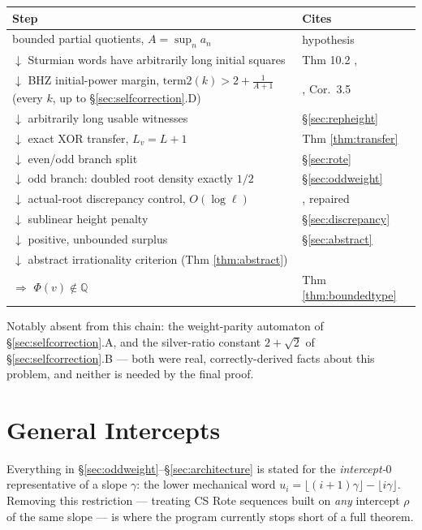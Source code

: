\documentclass[11pt]{article}
\newcommand{\Q}{\mathbb{Q}}
\begin{document}
\begin{center}
\begin{tabular}{ll}
\toprule
Step & Cites \\
\midrule
bounded partial quotients, $A=\sup_n a_n$ & hypothesis \\
$\downarrow$ Sturmian words have arbitrarily long initial squares & Thm 10.2 \cite{DeJesus2026Sturmian}, \cite{ADQZ2001} \\
$\downarrow$ BHZ initial-power margin, $\text{term2}(k)>2+\tfrac1{A+1}$ (every $k$, up to \S\ref{sec:selfcorrection}.D) & \cite{BHZ2006}, Cor.\ 3.5 \\
$\downarrow$ arbitrarily long usable witnesses & \S\ref{sec:repheight} \\
$\downarrow$ exact XOR transfer, $L_v=L+1$ & Thm \ref{thm:transfer} \cite{Phase2Transfer,Phase5Transfer} \\
$\downarrow$ even/odd branch split & \S\ref{sec:rote} \\
$\downarrow$ odd branch: doubled root density exactly $1/2$ & \S\ref{sec:oddweight} \cite{Phase4Required} \\
$\downarrow$ actual-root discrepancy control, $O(\log\ell)$ & \cite{Phase2Discrepancy}, repaired \cite{Phase5Hostile} \\
$\downarrow$ sublinear height penalty & \S\ref{sec:discrepancy} \\
$\downarrow$ positive, unbounded surplus & \S\ref{sec:abstract} \\
$\downarrow$ abstract irrationality criterion (Thm \ref{thm:abstract}) & \cite{Phase2Abstract} \\
$\Rightarrow$ $\Phi(v)\notin\Q$ & Thm \ref{thm:boundedtype} \\
\bottomrule
\end{tabular}
\end{center}

Notably absent from this chain: the weight-parity automaton of \S\ref{sec:selfcorrection}.A, and the silver-ratio constant $2+\sqrt2$ of \S\ref{sec:selfcorrection}.B --- both were real, correctly-derived facts about this problem, and neither is needed by the final proof.

\section{General Intercepts}
\label{sec:generalintercept}

Everything in \S\ref{sec:oddweight}--\S\ref{sec:architecture} is stated for the \emph{intercept-$0$} representative of a slope $\gamma$: the lower mechanical word $u_i=\lfloor(i+1)\gamma\rfloor-\lfloor i\gamma\rfloor$. Removing this restriction --- treating CS Rote sequences built on \emph{any} intercept $\rho$ of the same slope --- is where the program currently stops short of a full theorem.
\end{document}
